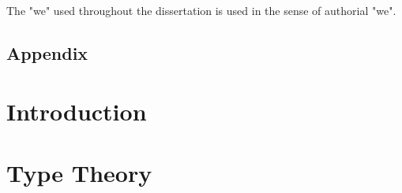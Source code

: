 \documentclass{l4proj}
\begin{document}
The "we" used throughout the dissertation is used in the sense of
authorial "we". 

\begin{toappendix}
  \chapter{Appendix}
\end{toappendix}


\tableofcontents


%
%
%
%
%
%
%
\chapter{Introduction}



\chapter{Type Theory}

\end{document}
